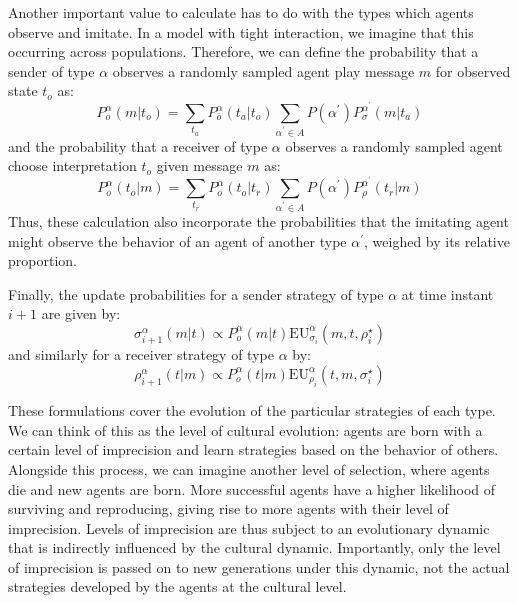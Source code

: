 \documentclass[a4paper]{article}
\begin{document}
Another important value to calculate has to do with the types which agents observe and imitate.
In a model with tight interaction, we imagine that this occurring across populations.
Therefore, we can define the probability that a sender of type $\alpha$ observes a randomly sampled agent play message $m$ for observed state $t_o$ as:
$$
P_{o}^{\alpha}(m|t_{o})=\sum_{t_{a}}P_{\bar{o}}^{\alpha}(t_{a}|t_{o})\sum_{\alpha^{\prime}\in A}P(\alpha^{\prime})P_{\sigma}^{\alpha^{\prime}}(m|t_{a})
$$
and the probability that a receiver of type $\alpha$ observes a randomly sampled agent choose interpretation $t_o$ given message $m$ as:
$$
P_{o}^{\alpha}(t_{o}|m)=\sum_{t_{r}}P_{o}^{\alpha}(t_{o}|t_{r})\sum_{\alpha^{\prime}\in A}P(\alpha^{\prime})P_{\rho}^{\alpha^{\prime}}(t_{r}|m)
$$
Thus, these calculation also incorporate the probabilities that the imitating agent might observe the behavior of an agent of another type $\alpha^\prime$, weighed by its relative proportion.

Finally, the update probabilities for a sender strategy of type $\alpha$ at time instant $i+1$ are given by:
$$
\sigma_{i+1}^{\alpha}(m|t) \propto P_{o}^{\alpha}(m|t)\text{EU}_{\sigma_{i}}^{\alpha}(m,t,\rho_{i}^{\star})
$$
and similarly for a receiver strategy of type $\alpha$ by:
$$
\rho_{i+1}^{\alpha}(t|m) \propto P_{o}^{\alpha}(t|m)\text{EU}_{\rho_{i}}^{\alpha}(t,m,\sigma_{i}^{\star})
$$

These formulations cover the evolution of the particular strategies of each type.
We can think of this as the level of cultural evolution: agents are born with a certain level of imprecision and learn strategies based on the behavior of others.
Alongside this process, we can imagine another level of selection, where agents die and new agents are born.
More successful agents have a higher likelihood of surviving and reproducing, giving rise to more agents with their level of imprecision.
Levels of imprecision are thus subject to an evolutionary dynamic that is indirectly influenced by the cultural dynamic.
Importantly, only the level of imprecision is passed on to new generations under this dynamic, not the actual strategies developed by the agents at the cultural level.
\end{document}
